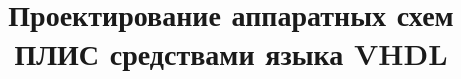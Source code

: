 

\title{Проектирование аппаратных схем ПЛИС средствами языка VHDL}

\date{}

\makeindex


\frontmatter
\maketitle
\tableofcontents

\mainmatter














